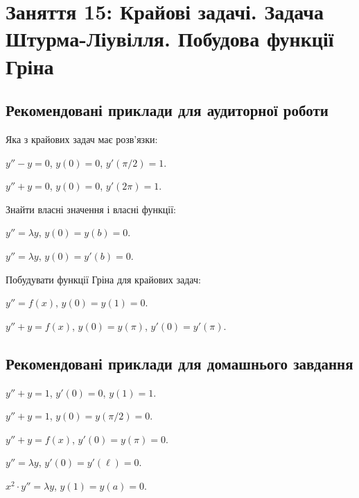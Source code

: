 \section*{Заняття 15: Крайові задачі. Задача Штурма-Ліувілля. Побудова функції Гріна}

\subsection*{Рекомендовані приклади для аудиторної роботи}

Яка з крайових задач має розв'язки:

\begin{problem}
	$y'' - y = 0$, $y(0) = 0$, $y'(\pi / 2) = 1$.
\end{problem}

\begin{problem}
	$y'' + y = 0$, $y(0) = 0$, $y'(2 \pi) = 1$.
\end{problem}

Знайти власні значення і власні функції:

\begin{problem}
		$y'' = \lambda y$, $y(0) = y(b) = 0$.
\end{problem}

\begin{problem}
	$y'' = \lambda y$, $y(0) = y'(b) = 0$.
\end{problem}

Побудувати функції Гріна для крайових задач:

\begin{problem}
	$y'' = f(x)$, $y(0) = y(1) = 0$.
\end{problem}

\begin{problem}
	$y'' + y = f(x)$, $y(0) = y(\pi)$, $y'(0) = y'(\pi)$.
\end{problem}

\subsection*{Рекомендовані приклади для домашнього завдання}

\begin{problem}
	$y'' + y = 1$, $y'(0) = 0$, $y(1) = 1$.
\end{problem}

\begin{problem}
	$y'' + y = 1$, $y(0) = y (\pi / 2) = 0$.
\end{problem}

\begin{problem}
	$y'' + y = f(x)$, $y'(0) = y (\pi) = 0$.
\end{problem}

\begin{problem}
	$y'' = \lambda y$, $y'(0) = y'(\ell) = 0$.
\end{problem}

\begin{problem}
	$x^2 \cdot y'' = \lambda y$, $y(1) = y(a) = 0$.
\end{problem}

